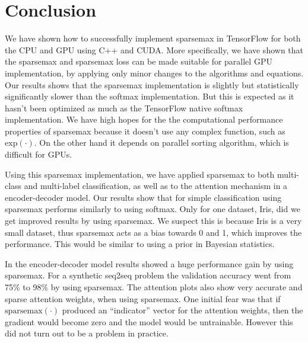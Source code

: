 \section{Conclusion}

We have shown how to successfully implement sparsemax in TensorFlow for both the CPU and GPU using C++ and CUDA. More specifically, we have shown that the sparsemax and sparsemax loss can be made suitable for parallel GPU implementation, by applying only minor changes to the algorithms and equations. Our results shows that the sparsemax implementation is slightly but statistically significantly slower than the softmax implementation. But this is expected as it hasn't been optimized as much as the TensorFlow native softmax implementation. We have high hopes for the the computational performance properties of sparsemax because it doesn't use any complex function, such as $\mathrm{exp}(\cdot)$. On the other hand it depends on parallel sorting algorithm, which is difficult for GPUs.

Using this sparsemax implementation, we have applied sparsemax to both multi-class and multi-label classification, as well as to the attention mechanism in a encoder-decoder model. Our results show that for simple classification using sparsemax performs similarly to using softmax. Only for one dataset, Iris, did we get improved results by using sparsemax. We suspect this is because Iris is a very small dataset, thus sparsemax acts as a bias towards 0 and 1, which improves the performance. This would be similar to using a prior in Bayesian statistics.

In the encoder-decoder model results showed a huge performance gain by using sparsemax. For a synthetic seq2seq problem the validation accuracy went from 75\% to 98\% by using sparsemax. The attention plots also show very accurate and sparse attention weights, when using sparsemax. One initial fear was that if $\mathrm{sparsemax}(\cdot)$ produced an ``indicator'' vector for the attention weights, then the gradient would become zero and the model would be untrainable. However this did not turn out to be a problem in practice.